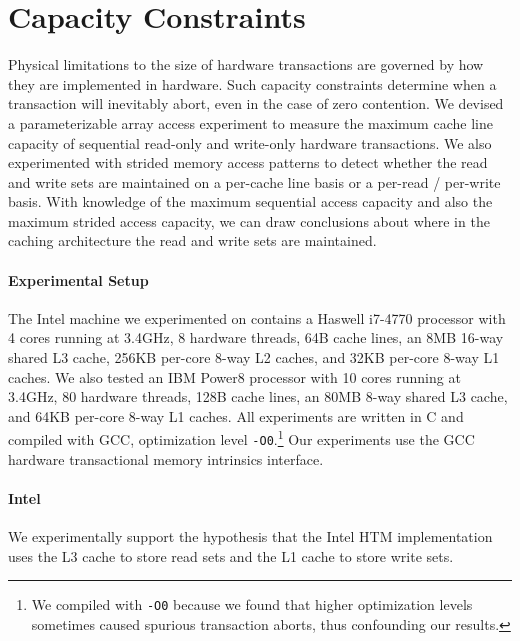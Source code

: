 \section{Capacity Constraints}
\label{sec:capacity}
Physical limitations to the size of hardware 
transactions are
governed by how they are implemented in hardware. 
Such capacity constraints
determine when a transaction will inevitably abort, 
even in the case of zero contention. We 
devised a parameterizable array access
experiment to measure the maximum cache line capacity 
of sequential read-only and write-only
hardware transactions. We also experimented with strided 
memory access patterns
to detect whether the read and write sets are maintained
on a per-cache line basis or a per-read / per-write basis.
With knowledge of the maximum sequential access 
capacity and also the maximum
strided access capacity, we can draw conclusions 
about where in the caching
architecture the read and write sets are 
maintained. 

\paragraph{Experimental Setup}
The Intel machine we experimented on contains a Haswell i7-4770 processor with 4
cores running at 3.4GHz, 8 hardware threads, 64B cache lines, an 8MB 16-way
shared L3 cache, 256KB per-core 8-way L2 caches, and 32KB per-core 8-way L1
caches. We also tested an IBM Power8 processor with 10 cores running at 3.4GHz,
80 hardware threads, 128B cache lines, an 80MB 8-way shared L3 cache, and 64KB
per-core 8-way L1 caches. All experiments are written in C and compiled with
GCC, optimization level \texttt{-O0}.\footnote{We compiled with \texttt{-O0}
because we found that higher optimization levels sometimes caused spurious
transaction aborts, thus confounding our results.} Our experiments use the GCC
hardware transactional memory intrinsics interface.

\paragraph{Intel}
We experimentally support the hypothesis
that the Intel HTM implementation uses the L3 cache to 
store read sets and the L1 cache to store write sets.

